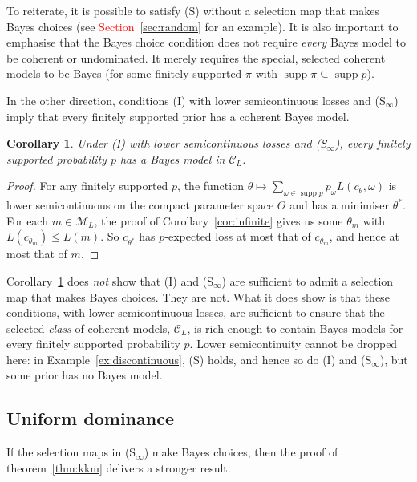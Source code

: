 \documentclass[11pt]{article}
\newtheorem{corollary}[theorem]{Corollary}
\theoremstyle{definition}
\theoremstyle{remark}
\newcommand{\M}{\mathcal M}
\newcommand{\C}{\mathcal C}
\newcommand{\supp}{\operatorname{supp}}
\begin{document}
To reiterate, it is possible to satisfy (S) without a selection map that makes Bayes choices (see \textcolor{red}{Section~\ref{sec:random}} for an example). It is also important to emphasise that the Bayes choice condition does not require \emph{every} Bayes model to be coherent or undominated. It merely requires the special, selected coherent models to be Bayes (for some finitely supported $\pi$ with $\supp\pi\subseteq\supp p$). 



In the other direction, conditions (I) with lower semicontinuous losses and (S$_\infty$) imply that every finitely supported prior has a coherent Bayes model. 
\begin{corollary}\label{cor:bayes}
Under (I) with lower semicontinuous losses and (S$_\infty$), every finitely supported probability $p$ has a Bayes model in $\C_L$.
\end{corollary}
\begin{proof}
For any finitely supported $p$, the function $\theta\mapsto\sum_{\omega\in\supp p}p_\omega L(c_\theta,\omega)$ is lower semicontinuous on the compact parameter space $\Theta$ and has a minimiser $\theta^*$. For each $m\in\M_L$, the proof of Corollary~\ref{cor:infinite} gives us some $\theta_m$ with $L(c_{\theta_m})\le L(m)$. So $c_{\theta^*}$ has $p$-expected loss at most that of $c_{\theta_m}$, and hence at most that of $m$.
\end{proof}
Corollary~\ref{cor:bayes} does \textit{not} show that (I) and (S$_\infty$) are sufficient to admit a selection map that makes Bayes choices. They are not. What it does show is that these conditions, with lower semicontinuous losses, are sufficient to ensure that the selected \textit{class} of coherent models, $\C_L$, is rich enough to contain Bayes models for every finitely supported probability $p$. Lower semicontinuity cannot be dropped here: in Example~\ref{ex:discontinuous}, (S) holds, and hence so do (I) and (S$_\infty$), but some prior has no Bayes model.





\subsection{Uniform dominance}


If the selection maps in (S$_\infty$) make Bayes choices, then the proof of theorem~\ref{thm:kkm} delivers a stronger result.
\end{document}
